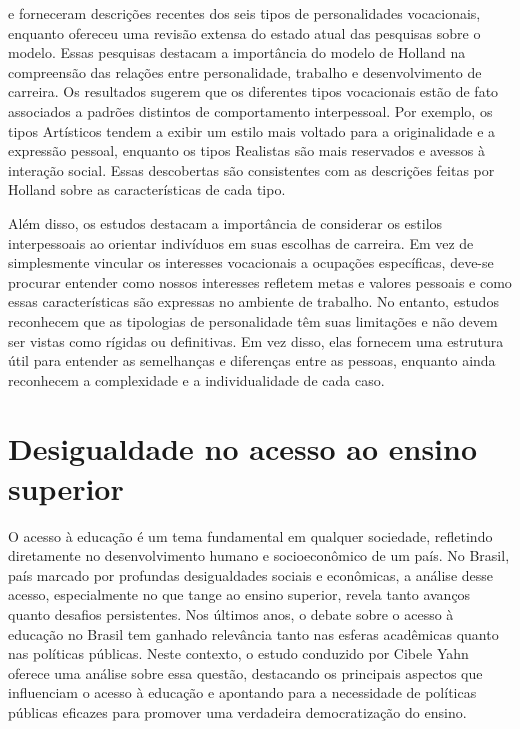\cite{magalhaes2004relacao} e \cite{martins1978psicologia} forneceram descrições recentes dos seis tipos de personalidades vocacionais, enquanto \cite{de2006relaccao} ofereceu uma revisão extensa do estado atual das pesquisas sobre o modelo. Essas pesquisas destacam a importância do modelo de Holland na compreensão das relações entre personalidade, trabalho e desenvolvimento de carreira. Os resultados sugerem que os diferentes tipos vocacionais estão de fato associados a padrões distintos de comportamento interpessoal. Por exemplo, os tipos Artísticos tendem a exibir um estilo mais voltado para a originalidade e a expressão pessoal, enquanto os tipos Realistas são mais reservados e avessos à interação social. Essas descobertas são consistentes com as descrições feitas por Holland sobre as características de cada tipo.

Além disso, os estudos destacam a importância de considerar os estilos interpessoais ao orientar indivíduos em suas escolhas de carreira. Em vez de simplesmente vincular os interesses vocacionais a ocupações específicas, deve-se procurar entender como nossos interesses refletem metas e valores pessoais e como essas características são expressas no ambiente de trabalho.  No entanto, estudos reconhecem que as tipologias de personalidade têm suas limitações e não devem ser vistas como rígidas ou definitivas. Em vez disso, elas fornecem uma estrutura útil para entender as semelhanças e diferenças entre as pessoas, enquanto ainda reconhecem a complexidade e a individualidade de cada caso.


\section{Desigualdade no acesso ao ensino superior}

O acesso à educação é um tema fundamental em qualquer sociedade, refletindo diretamente no desenvolvimento humano e socioeconômico de um país. No Brasil, país marcado por profundas desigualdades sociais e econômicas, a análise desse acesso, especialmente no que tange ao ensino superior, revela tanto avanços quanto desafios persistentes. Nos últimos anos, o debate sobre o acesso à educação no Brasil tem ganhado relevância tanto nas esferas acadêmicas quanto nas políticas públicas. Neste contexto, o estudo conduzido por Cibele Yahn oferece uma análise sobre essa questão, destacando os principais aspectos que influenciam o acesso à educação e apontando para a necessidade de políticas públicas eficazes para promover uma verdadeira democratização do ensino.

